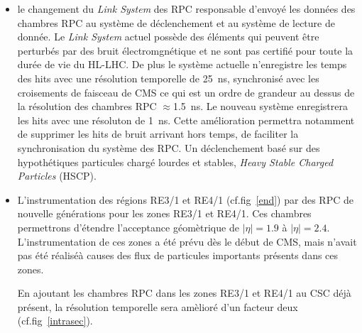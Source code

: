 \begin{itemize}[label=$\bullet$]
	\item le changement du \textit{Link System} des RPC responsable d'envoyé les données des chambres RPC au système de déclenchement et au système de lecture de donnée. Le \textit{Link System} actuel possède des éléments  qui peuvent être perturbés par des bruit électromgnétique et ne sont pas certifié pour toute la durée de vie du HL-LHC. De plus le système actuelle n'enregistre les temps des hits avec une résolution temporelle de \SI{25}{\nano\second}, synchronisé avec les croisements de faisceau de CMS ce qui est un ordre de grandeur au dessus de la résolution des chambres RPC $\approx$\SI{1.5}{\nano\second}. Le nouveau système enregistrera les hits avec une résoluton de \SI{1}{\nano\second}. Cette amélioration permettra notamment de supprimer les hits de bruit arrivant hors temps, de faciliter la synchronisation du système des RPC. Un déclenchement basé sur des hypothétiques particules chargé lourdes et stables, \textit{Heavy Stable Charged Particles} (HSCP).
	
	\item L'instrumentation des régions RE3/1 et RE4/1 (cf.fig~\ref{end}) par des RPC de nouvelle générations pour les zones RE3/1 et RE4/1. Ces chambres permettrons d'étendre l'acceptance géomètrique de $|\eta|=\num{1.9}$ à  $|\eta|=\num{2.4}$. L'instrumentation de ces zones a été prévu dès le début de CMS, mais n'avait pas été réaliséà causes des flux de particules importants présents dans ces zones. 
	
	En ajoutant les chambres RPC dans les zones RE3/1 et RE4/1 au CSC déjà présent, la résolution temporelle sera amèlioré d'un facteur deux (cf.fig~\ref{intrasec}).
	

\end{itemize}

